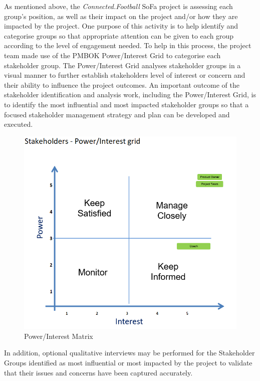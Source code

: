 As mentioned above, the \textit{Connected.Football} SoFa project is assessing each group’s position, as well as their impact on the project and/or how they are impacted by the project.  One purpose of this activity is to help identify and categorise groups so that appropriate attention can be given to each group according to the level of engagement needed. To help in this process, the project team made use of the PMBOK Power/Interest Grid to categorise each stakeholder group.  The Power/Interest Grid analyses stakeholder groups in a visual manner to further establish stakeholders level of interest or concern and their ability to influence the project outcomes. 
\newline
An important outcome of the stakeholder identification and analysis work, including the Power/Interest Grid, is to identify the most influential and most impacted stakeholder groups so that a focused stakeholder management strategy and plan can be developed and executed.

\begin{figure}[H]
  \includegraphics[width=\linewidth]{content/diagram/stakeholder/power_interest.png}
  \caption{Power/Interest Matrix}
\end{figure}

In addition, optional qualitative interviews may be performed for the Stakeholder Groups identified as most influential or most impacted by the project to validate that their issues and concerns have been captured accurately.

